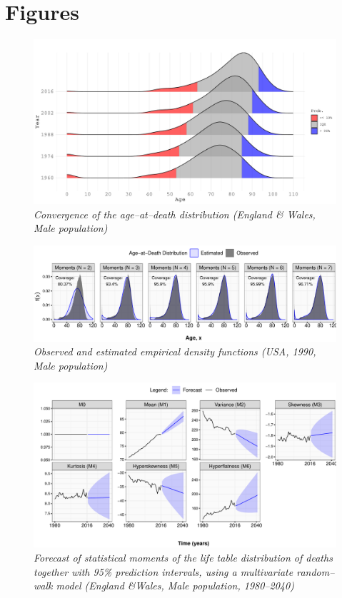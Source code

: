 \documentclass[T0_MEM]{subfiles}
\begin{document}
\section*{Figures}

\begin{figure}[!h]
  \centering
  \includegraphics[width=1\linewidth]{figure/Figure-ObservedDx}
  \caption{\textit{Convergence of the age--at--death distribution
  (England \& Wales, Male population)}}
  \label{fig:ObservedDx}
\end{figure}

\begin{figure}[!h]
  \centering
  \includegraphics[width=1\linewidth]{figure/Figure-Convergence}
  \caption{\textit{Observed and estimated empirical density functions
  (USA, 1990, Male population)}}
  \label{fig:P_coverage}
\end{figure}

\begin{figure}[!h]
  \centering
  \includegraphics[width=1\linewidth]{figure/Figure-Moments}
  \caption{\textit{Forecast of statistical moments of the life table distribution of deaths together with 95\% prediction intervals, using a multivariate random--walk model (England \&Wales, Male population, 1980--2040)}}
  \label{fig:Moments}
\end{figure}
\end{document}

